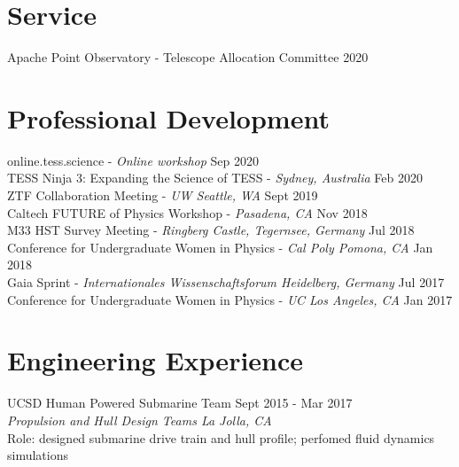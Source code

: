 \documentclass[margin,line]{resume}
\begin{document}
\begin{resume}

\section{\mysidestyle \textcolor{bcolor}{Service}}
Apache Point Observatory - Telescope Allocation Committee \hfill 2020


\section{\mysidestyle \textcolor{bcolor}{Professional Development}}
online.tess.science - \textit{Online workshop} \hfill Sep 2020 \\
TESS Ninja 3: Expanding the Science of TESS - \textit{Sydney, Australia} \hfill Feb 2020 \\
ZTF Collaboration Meeting - \textit{UW Seattle, WA} \hfill Sept 2019 \\
Caltech FUTURE of Physics Workshop - \textit{Pasadena, CA} \hfill Nov 2018 \\
M33 HST Survey Meeting - \textit{Ringberg Castle, Tegernsee, Germany} \hfill Jul 2018 \\
Conference for Undergraduate Women in Physics - \textit{Cal Poly Pomona, CA}  \hfill Jan 2018 \\
Gaia Sprint - \textit{Internationales Wissenschaftsforum Heidelberg, Germany}  \hfill Jul 2017 \\
{Conference for Undergraduate Women in Physics} - \textit{UC Los Angeles, CA}  \hfill Jan 2017 


\section{\mysidestyle \textcolor{bcolor}{Engineering Experience}}
UCSD Human Powered Submarine Team \hfill Sept 2015 - Mar 2017 \\
\-\hspace{.25cm} \textit{Propulsion and Hull Design Teams \hfill La Jolla, CA}  \\
\-\hspace{.25cm} Role: designed submarine drive train and hull profile; perfomed fluid dynamics simulations


\end{resume}
\end{document}
